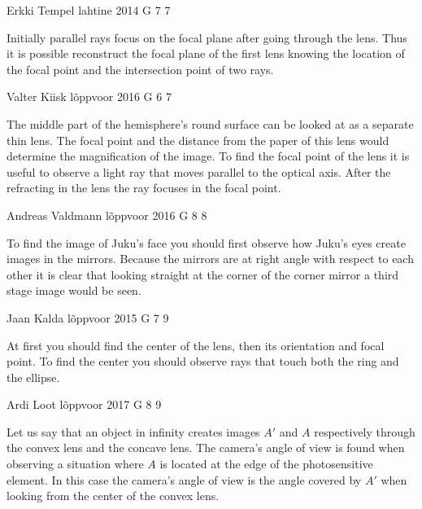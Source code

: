 \documentclass[11pt]{article}
\begin{document}
{Erkki Tempel} %
{lahtine} %
{2014} %
{G 7} %
{7} %
{

\ifEngHint
Initially parallel rays focus on the focal plane after going through the lens. Thus it is possible reconstruct the focal plane of the first lens knowing the location of the focal point and the intersection point of two rays.
\fi
}

{Valter Kiisk} %
{lõppvoor} %
{2016} %
{G 6} %
{7} %
{

\ifEngHint
The middle part of the hemisphere’s round surface can be looked at as a separate thin lens. The focal point and the distance from the paper of this lens would determine the magnification of the image. To find the focal point of the lens it is useful to observe a light ray that moves parallel to the optical axis. After the refracting in the lens the ray focuses in the focal point.
\fi
}

{Andreas Valdmann} %
{lõppvoor} %
{2016} %
{G 8} %
{8} %
{

\ifEngHint
To find the image of Juku’s face you should first observe how Juku’s eyes create images in the mirrors. Because the mirrors are at right angle with respect to each other it is clear that looking straight at the corner of the corner mirror a third stage image would be seen.
\fi
}

{Jaan Kalda} %
{lõppvoor} %
{2015} %
{G 7} %
{9} %
{

\ifEngHint
At first you should find the center of the lens, then its orientation and focal point. To find the center you should observe rays that touch both the ring and the ellipse.
\fi
}

{Ardi Loot} %
{lõppvoor} %
{2017} %
{G 8} %
{9} %
{

\ifEngHint
Let us say that an object in infinity creates images $A'$ and $A$ respectively through the convex lens and the concave lens. The camera’s angle of view is found when observing a situation where $A$ is located at the edge of the photosensitive element. In this case the camera’s angle of view is the angle covered by $A'$ when looking from the center of the convex lens.
\fi
}
\end{document}
